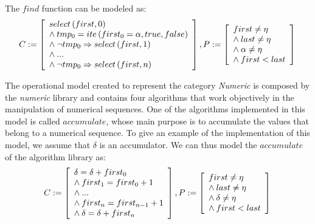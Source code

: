 \documentclass[a4paper]{llncs}
\begin{document}
%
The $find$ function can be modeled as:
%
\begin{equation}
\label{quantifier-free-formulae-find}
C := \left [ \begin{array}{ll}
            select\left(first, 0\right) \\
	    \wedge \:tmp_{0} = ite\left(first_{0} = \alpha, true,  false\right) \\
            \wedge \:\neg tmp_{0} \Rightarrow select\left(first, 1\right) \\
            \wedge \:... \\
            \wedge \:\neg tmp_{0} \Rightarrow select\left(first, n\right) \\
              \end{array} \right ],  \\
P := \left [ \begin{array}{ll}
            first \neq \eta \\
	    \wedge \:last \neq \eta \\
	    \wedge \:\alpha \neq \eta \\
	    \wedge \:first < last \\
              \end{array} \right ]  \\
\end{equation}
%

The operational model created to represent the category \textit{Numeric} is
composed by the \textit{numeric} library and contains four algorithms that work
objectively in the manipulation of numerical sequences. One of the algorithms
implemented in this model is called $accumulate$, whose main purpose is
to accumulate the values that belong to a numerical sequence. To give an example
of the implementation of this model, we assume that $\delta$ is an accumulator.
We can thus model the $accumulate$ of the algorithm library as:
%
\begin{equation}
\label{quantifier-free-formulae-accumulate}
C := \left [ \begin{array}{ll}
            \delta = \delta + first_{0} \\
            \wedge \:first_{1} = first_{0} +1 \\
            \wedge \:... \\
            \wedge \:first_{n} = first_{n-1} +1 \\
            \wedge \:\delta = \delta + first_{n} \\
              \end{array} \right ],  \\
P := \left [ \begin{array}{ll}
            first \neq \eta \\
	    \wedge \:last \neq \eta \\
	    \wedge \:\delta \neq \eta \\
	    \wedge \:first < last \\
              \end{array} \right ]  \\
\end{equation}
\end{document}

